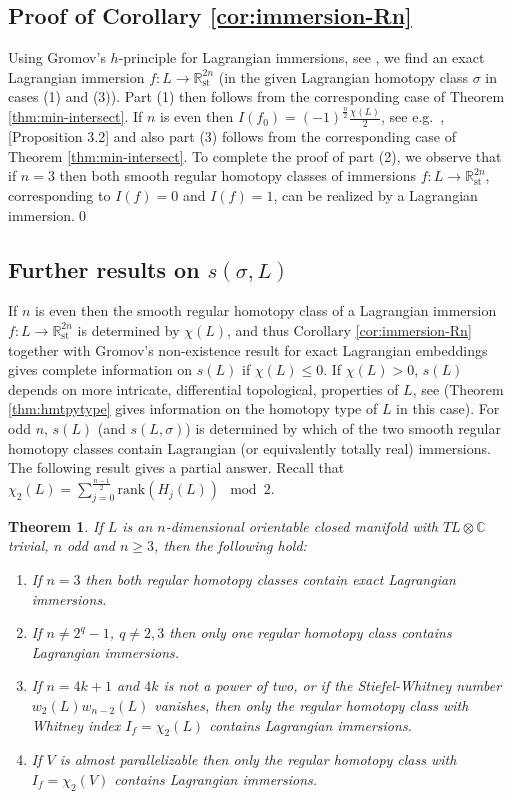 \documentclass[reqno,11pt]{amsart}
\numberwithin{equation}{section}
\theoremstyle{my}
\theoremstyle{my}
\newtheorem{Theorem}[thm]{Theorem}
\theoremstyle{your}
\newcommand{\R}{\mathbb{R}}
\newcommand{\C}{\mathbb{C}}
\newcommand{\rk}{\mathrm{rank}}
\newcommand{\st}{\mathrm{st}}
\begin{document}
\subsection{Proof of Corollary \ref{cor:immersion-Rn}}\label{ssec:proofimmersion-Rn}
Using Gromov's $h$-principle for Lagrangian immersions, see \cite{Gpdr}, we find an exact Lagrangian immersion  $f\colon L\to \R^{2n}_\st$ (in the given Lagrangian homotopy class $\sigma$ in cases (1) and (3)). Part (1) then follows from the corresponding case of Theorem \ref{thm:min-intersect}. 
If $n$ is even then $I({f_0})=(-1)^{\frac n2}\frac{\chi(L)}2$, see e.g.~\cite{EkEtSu}, [Proposition 3.2] and also part (3)  follows from the corresponding case of Theorem \ref{thm:min-intersect}.  To complete the proof of part (2), we observe that if $n=3$
then both smooth regular homotopy classes of immersions $f\colon L\to\R^{2n}_\st$, corresponding to $I({f})=0$ and $I({f})=1$, can be realized by a Lagrangian immersion.\qed



\subsection{Further results on $s(\sigma,L)$}\label{ssec:more-Rn}
If $n$ is even then the smooth regular homotopy class of a Lagrangian immersion $f\colon L\to\R^{2n}_\st$ is determined by $\chi(L)$, and thus Corollary \ref{cor:immersion-Rn} together with Gromov's non-existence result for exact Lagrangian embeddings gives complete information on $s(L)$ if $\chi(L)\le 0$. If $\chi(L)>0$, $s(L)$ depends on more intricate, differential topological, properties of $L$, see \cite{ES1,ES2} (Theorem \ref{thm:hmtpytype} gives information on the homotopy type of $L$ in this case). For odd $n$, $s(L)$ (and $s(L,\sigma)$) is determined by which of the two smooth regular homotopy classes contain Lagrangian (or equivalently totally real) immersions. The following result gives a partial answer. Recall that $\chi_2(L) = \sum_{j=0}^{\frac{n-1}2}\rk (H_j(L)) \mod 2$.

\begin{Theorem}     
If $L$ is an $n$-dimensional orientable closed manifold with $TL\otimes\C$ trivial, $n$ odd and $n\ge 3$, then the following hold:
\begin{enumerate}
\item If $n=3$ then both regular homotopy classes contain exact Lagrangian immersions.
\item If $n\ne 2^{q}-1$, $q\ne 2,3$ then only one regular homotopy class contains Lagrangian immersions. 
\item If $n=4k+1$ and $4k$ is not a power of two, or if the Stiefel-Whitney number  $w_2(L)w_{n-2}(L)$ vanishes, then only the regular homotopy class with Whitney index $I_f=\chi_2(L)$ contains Lagrangian immersions.
\item If $V$ is almost parallelizable then only the regular homotopy class with $I_{f}=\chi_2(V)$ contains Lagrangian immersions.
\end{enumerate}
\end{Theorem}
\end{document}

